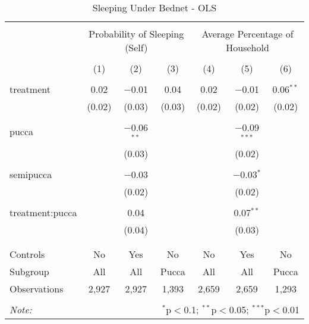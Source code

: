
\begin{table}[!htbp] \centering 
  \caption{Sleeping Under Bednet - OLS} 
  \label{tbl:Sleeping Under Bednet - OLS} 
\begin{tabular}{@{\extracolsep{5pt}}lcccccc} 
\\[-1.8ex]\hline 
\hline \\[-1.8ex] 
 & \multicolumn{3}{c}{Probability of Sleeping (Self)} & \multicolumn{3}{c}{Average Percentage of Household} \\ 
\\[-1.8ex] & (1) & (2) & (3) & (4) & (5) & (6)\\ 
\hline \\[-1.8ex] 
 treatment & 0.02 & $-$0.01 & 0.04 & 0.02 & $-$0.01 & 0.06$^{**}$ \\ 
  & (0.02) & (0.03) & (0.03) & (0.02) & (0.02) & (0.02) \\ 
  & & & & & & \\ 
 pucca &  & $-$0.06$^{**}$ &  &  & $-$0.09$^{***}$ &  \\ 
  &  & (0.03) &  &  & (0.02) &  \\ 
  & & & & & & \\ 
 semipucca &  & $-$0.03 &  &  & $-$0.03$^{*}$ &  \\ 
  &  & (0.02) &  &  & (0.02) &  \\ 
  & & & & & & \\ 
 treatment:pucca &  & 0.04 &  &  & 0.07$^{**}$ &  \\ 
  &  & (0.04) &  &  & (0.03) &  \\ 
  & & & & & & \\ 
\hline \\[-1.8ex] 
Controls & No & Yes & No & No & Yes & No \\ 
Subgroup & All & All & Pucca & All & All & Pucca \\ 
Observations & 2,927 & 2,927 & 1,393 & 2,659 & 2,659 & 1,293 \\ 
\hline 
\hline \\[-1.8ex] 
\textit{Note:}  & \multicolumn{6}{r}{$^{*}$p$<$0.1; $^{**}$p$<$0.05; $^{***}$p$<$0.01} \\ 
\end{tabular} 
\end{table} 
